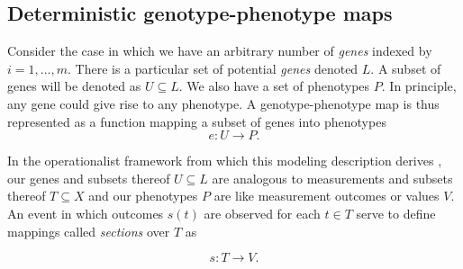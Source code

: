 \subsection{Deterministic genotype-phenotype maps}
Consider the case in which we have an arbitrary number of \emph{genes} indexed by $i=1, \ldots, m$. There is a particular set of potential \emph{genes} denoted $L$. A subset of genes will be denoted as $U \subseteq L$. We also have a set of phenotypes $P$. In principle, any gene could give rise to any phenotype. A genotype-phenotype map is thus represented as a function mapping a subset of genes into phenotypes
$$
e \colon U \rightarrow  P.
$$

In the operationalist framework from which this modeling description derives \cite{Abramsky2011}, our genes and subsets thereof $U \subseteq L$ are analogous to measurements and subsets thereof $T \subseteq X$ and our phenotypes $P$ are like measurement outcomes or values $V$. An event in which outcomes $s(t)$ are observed for each $t \in T$ serve to define mappings called \emph{sections} over $T$ as

$$
s \colon T \rightarrow V.
$$

